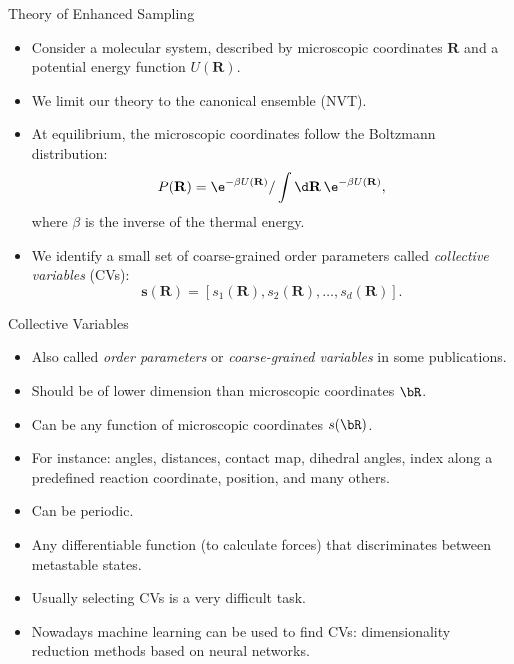 \documentclass[10pt]{beamer}
\begin{document}
\begin{frame}{Theory of Enhanced Sampling}
\begin{itemize}
\setlength\itemsep{1em}
  \item Consider a molecular system, described by microscopic coordinates $\mathbf{R}$ and a potential energy function $U(\mathbf{R})$.

  \item We limit our theory to the canonical ensemble (NVT).

  \item At equilibrium, the microscopic coordinates follow the Boltzmann distribution:
  \begin{equation}
    P(\mathbf{R}) = \e^{-\beta U(\mathbf{R})}/\int \d\mathbf{R} \,\e^{-\beta U(\mathbf{R})},
  \label{eq:pr}
  \end{equation}
  where $\beta$ is the inverse of the thermal energy.

  \item We identify a small set of coarse-grained order parameters called \textit{collective variables} (CVs):
  \begin{equation}
    \mathbf{s}(\mathbf{R}) = [s_1(\mathbf{R}), s_2(\mathbf{R}), \ldots, s_d(\mathbf{R})].
  \end{equation}
\end{itemize}
\end{frame}

\begin{frame}{Collective Variables}
  \begin{itemize}
  \setlength\itemsep{1em}
    \item Also called \textit{order parameters} or \textit{coarse-grained variables} in some publications.
    \item Should be of lower dimension than microscopic coordinates $\bR$.
    \item Can be any function of microscopic coordinates $s(\bR)$.
    \item For instance: angles, distances, contact map, dihedral angles, index along a predefined reaction coordinate, position, and many others.
    \item Can be periodic.
    \item Any differentiable function (to calculate forces) that discriminates between metastable states.
    \item Usually selecting CVs is a very difficult task.
    \item Nowadays machine learning can be used to find CVs: dimensionality reduction methods based on neural networks.
  \end{itemize}
\end{frame}
\end{document}
